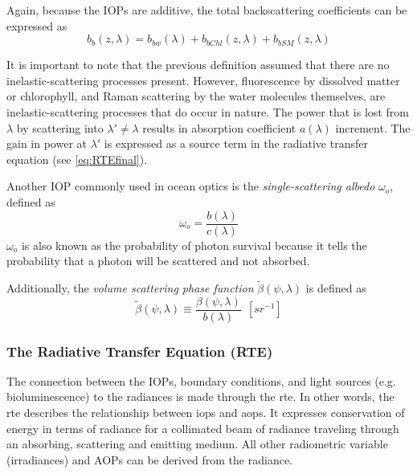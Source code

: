Again, because the IOPs are additive, the total backscattering coefficients can be expressed as
\begin{equation}\label{eq:b_btotal}
  b_b(z,\lambda) =  b_{bw}(\lambda) + b_{bChl}(z,\lambda)+b_{bSM}(z,\lambda)
\end{equation}

It is important to note that the previous definition assumed that there are no inelastic-scattering processes present. However, fluorescence by dissolved matter or chlorophyll, and Raman scattering by the water molecules themselves, are inelastic-scattering processes that do occur in nature. The power that is lost from $\lambda$ by scattering into $\lambda'\neq\lambda$ results in absorption coefficient $a(\lambda)$ increment. The gain in power at $\lambda'$ is expressed as a source term in the radiative transfer equation (see \autoref{eq:RTEfinal}).

Another IOP commonly used in ocean optics is the {\it single-scattering albedo}  $\omega_o$, defined as
\begin{equation}
  \omega_o=\frac{b(\lambda)}{c(\lambda)}
\end{equation}
$\omega_o$ is also known as the probability of photon survival because it tells the probability that a photon will be scattered and not absorbed.

Additionally, the {\it volume scattering phase function} $\tilde{\beta}(\psi,\lambda)$  is defined as
\begin{equation}
  \tilde{\beta}(\psi,\lambda)\equiv \frac{\beta(\psi,\lambda)}{b(\lambda)}~~\left[sr^{-1} \right]
\end{equation}

\subsubsection*{The Radiative Transfer Equation (RTE)}
The connection between the IOPs, boundary conditions, and light sources (e.g. bioluminescence) to the radiances is made through the \gls{rte}. In other words, the \gls{rte} describes the relationship between \gls{iops} and \gls{aops}. It expresses conservation of energy in terms of radiance for a collimated beam of radiance traveling through an absorbing, scattering and emitting medium. All other radiometric variable (irradiances) and AOPs can be derived from the radiance.

